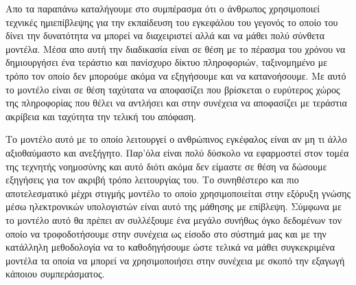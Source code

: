 \par
Απο τα παραπάνω καταλήγουμε στο συμπέρασμα ότι ο άνθρωπος χρησιμοποιεί τεχνικές ημιεπίβλεψης για την εκπαίδευση του εγκεφάλου του γεγονός το οποίο του δίνει την δυνατότητα να μπορεί να διαχειριστεί αλλά και να μάθει πολύ σύνθετα μοντέλα. Μέσα απο αυτή την διαδικασία είναι σε θέση με το πέρασμα του χρόνου να δημιουργήσει ένα τεράστιο και πανίσχυρο δίκτυο πληροφοριών, ταξινομημένο με τρόπο τον οποίο δεν μπορούμε ακόμα να εξηγήσουμε και να κατανοήσουμε. Με αυτό το μοντέλο είναι σε θέση ταχύτατα να αποφασίζει που βρίσκεται ο ευρύτερος χώρος της πληροφορίας που θέλει να αντλήσει και στην συνέχεια να αποφασίζει με τεράστια ακρίβεια και ταχύτητα την τελική του απόφαση.   
\par
Το μοντέλο αυτό με το οποίο λειτουργεί ο ανθρώπινος εγκέφαλος είναι αν μη τι άλλο αξιοθαύμαστο και ανεξήγητο. Παρ'όλα είναι πολύ δύσκολο να εφαρμοστεί στον τομέα της τεχνητής νοημοσύνης και αυτό διότι ακόμα δεν είμαστε σε θέση να δώσουμε εξηγήσεις για τον ακριβή τρόπο λειτουργίας του. Το συνηθέστερο και πιο αποτελεσματικό μέχρι στιγμής μοντέλο το οποίο χρησιμοποιείται στην εξόρυξη γνώσης μέσω ηλεκτρονικών υπολογιστών είναι αυτό της μάθησης με επίβλεψη. Σύμφωνα με το μοντέλο αυτό θα πρέπει αν συλλέξουμε ένα μεγάλο συνήθως όγκο δεδομένων τον οποίο να τροφοδοτήσουμε στην συνέχεια ως είσοδο στο σύστημά μας και με την κατάλληλη μεθοδολογία να το καθοδηγήσουμε ώστε τελικά να μάθει συγκεκριμένα μοντέλα τα οποία να μπορεί να χρησιμοποιήσει στην συνέχεια με σκοπό την εξαγωγή κάποιου συμπεράσματος.

